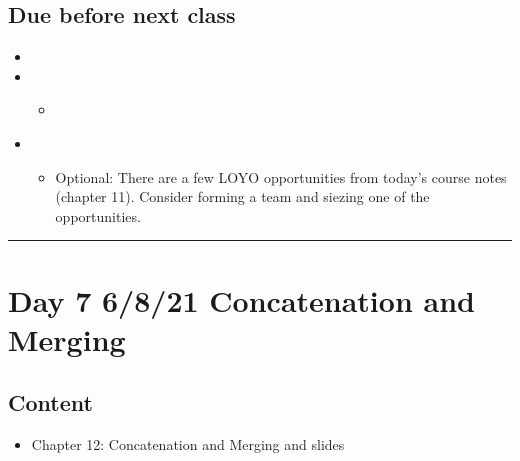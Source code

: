 \documentclass[letterpaper,10pt,english]{jupyterBook}
\begin{document}
\subsection{Due before next class}
\label{\detokenize{course-schedule:id10}}\begin{itemize}
\item {} 
\sphinxAtStartPar
{}

\item {} 
\sphinxAtStartPar
{}
\begin{itemize}
\item {} 
\sphinxAtStartPar
{\hyperref[\detokenize{chapter-12-concat-and-merge::doc}]{}}

\end{itemize}

\item {} 
\sphinxAtStartPar
{}
\begin{itemize}
\item {} 
\sphinxAtStartPar
Optional: There are a few LOYO opportunities from today’s course notes (chapter 11).  Consider forming a team and siezing one of the opportunities.

\end{itemize}

\end{itemize}


\bigskip\hrule\bigskip



\section{Day 7 \sphinxhyphen{} 6/8/21 \sphinxhyphen{} Concatenation and Merging}
\label{\detokenize{course-schedule:day-7-6-8-21-concatenation-and-merging}}

\subsection{Content}
\label{\detokenize{course-schedule:id11}}\begin{itemize}
\item {} 
\sphinxAtStartPar
Chapter 12: Concatenation and Merging \sphinxhyphen{} {\hyperref[\detokenize{chapter-12-concat-and-merge::doc}]{}} and slides

\end{itemize}
\end{document}
